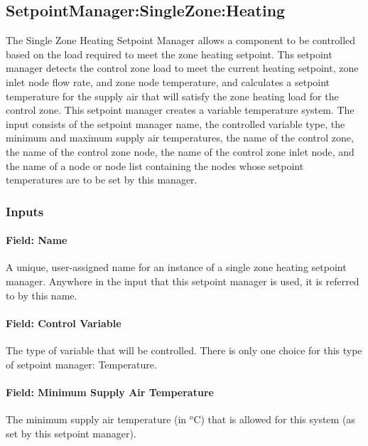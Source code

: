 \subsection{SetpointManager:SingleZone:Heating}\label{setpointmanagersinglezoneheating}

The Single Zone Heating Setpoint Manager allows a component to be controlled based on the load required to meet the zone heating setpoint. Ths setpoint manager detects the control zone load to meet the current heating setpoint, zone inlet node flow rate, and zone node temperature, and calculates a setpoint temperature for the supply air that will satisfy the zone heating load for the control zone. This setpoint manager creates a variable temperature system. The input consists of the setpoint manager name, the controlled variable type, the minimum and maximum supply air temperatures, the name of the control zone, the name of the control zone node, the name of the control zone inlet node, and the name of a node or node list containing the nodes whose setpoint temperatures are to be set by this manager.

\subsubsection{Inputs}\label{inputs-4-030}

\paragraph{Field: Name}\label{field-name-4-026}

A unique, user-assigned name for an instance of a single zone heating setpoint manager. Anywhere in the input that this setpoint manager is used, it is referred to by this name.

\paragraph{Field: Control Variable}\label{field-control-variable-4}

The type of variable that will be controlled. There is only one choice for this type of setpoint manager: Temperature.

\paragraph{Field: Minimum Supply Air Temperature}\label{field-minimum-supply-air-temperature-1}

The minimum supply air temperature (in \(^{o}\)C) that is allowed for this system (as set by this setpoint manager).

